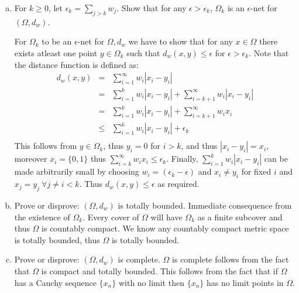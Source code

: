 \documentclass{article}
\def\le{\leqslant}
\begin{document}
\begin{enumerate}[a)]
\item For \( k \geq 0\), let \(\epsilon_k= \sum_{j>k} w_j\).  Show that for any \(\epsilon > \epsilon_k\), 
\(\Omega_k\) is an \(\epsilon\)-net for \((\Omega, d_w)\).

For $\Omega_k$ to be an $\epsilon$-net for $\Omega,d_w$ we have to show
that for any $x\in\Omega$ there exists atleast one point $y\in\Omega_k$ such
that $d_w(x,y)\le\epsilon$ for $\epsilon > \epsilon_k$. Note that the distance
function is defined as:
\begin{eqnarray}
d_w(x,y) & = & \sum_{i=1}^\infty w_i|x_i-y_i| \nonumber \\
         & = & \sum_{i=1}^k w_i|x_i-y_i| + \sum_{i=k+1}^\infty w_i|x_i-y_i|\nonumber\\
 & = & \sum_{i=1}^k w_i|x_i-y_i| + \sum_{i=k+1}^\infty w_i x_i \nonumber \\
 & \le & \sum_{i=1}^k w_i|x_i-y_i| + \epsilon_k \nonumber \\
\end{eqnarray}
This follows from $y\in\Omega_k$, thus $y_i=0$ for $i>k$, and thus
$|x_i-y_i|=x_i$, moreover $x_i=\{0,1\}$ thus $\sum_{i=k}^\infty w_i x_i \le \epsilon_k$. Finally, $\sum_{i=1}^k w_i|x_i-y_i|$ can be made arbitrarily small by
choosing $w_i=(\epsilon_k-\epsilon)$ and $x_i\ne y_i$ for fixed $i$ and
$x_j=y_j\ \forall j\ne i <k$. Thus $d_w(x,y)\le \epsilon$ as required.

\item Prove or disprove:  \((\Omega, d_w)\) is totally bounded. Immediate
consequence from the existence of $\Omega_k$. Every cover of $\Omega$ will
have $\Omega_k$ as a finite subcover and thus $\Omega$ is countably compact. 
We know any countably compact metric space is totally bounded, thus
$\Omega$ is totally bounded.

\item Prove or disprove:  \((\Omega, d_w)\) is complete. $\Omega$ is complete
follows from the fact that $\Omega$ is compact and totally bounded. This 
follows from the fact that if $\Omega$ has a Cauchy sequence $\{x_n\}$ with
no limit then $\{x_n\}$ has no limit points in $\Omega$.



\end{enumerate}
\end{document}
